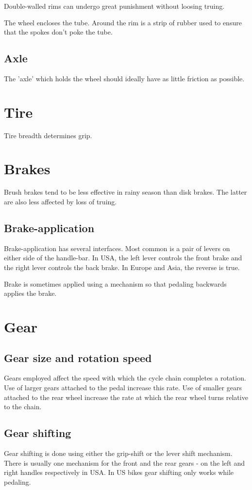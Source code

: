 \documentclass[oneside, article]{memoir}
\begin{document}
Double-walled rims can undergo great punishment without loosing truing.

The wheel encloses the tube. Around the rim is a strip of rubber used to ensure that the spokes don't poke the tube.

\subsection{Axle}
The 'axle' which holds the wheel should ideally have as little friction as possible.

\section{Tire}
Tire breadth determines grip.

\section{Brakes}
Brush brakes tend to be less effective in rainy season than disk brakes. The latter are also less affected by loss of truing.

\subsection{Brake-application}
Brake-application has several interfaces. Most common is a pair of levers on either side of the handle-bar. In USA, the left lever controls the front brake and the right lever controls the back brake. In Europe and Asia, the reverse is true.

Brake is sometimes applied using a mechanism so that pedaling backwards applies the brake.

\section{Gear}
\subsection{Gear size and rotation speed}
Gears employed affect the speed with which the cycle chain completes a rotation. Use of larger gears attached to the pedal increase this rate. Use of smaller gears attached to the rear wheel increase the rate at which the rear wheel turns relative to the chain.

\subsection{Gear shifting}
Gear shifting is done using either the grip-shift or the lever shift mechanism. There is usually one mechanism for the front  and the rear gears - on the left and right handles respectively in USA. In US bikes gear shifting only works while pedaling.
\end{document}
